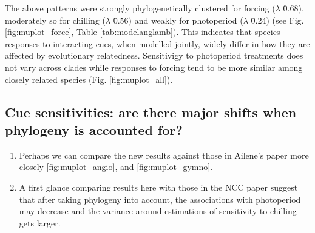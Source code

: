 \documentclass{article}\usepackage[]{graphicx}\usepackage[]{color}
\begin{document}
The above patterns were strongly phylogenetically clustered for forcing ($\lambda$ \= 0.68), moderately so for chilling ($\lambda$ \= 0.56) and weakly for photoperiod ($\lambda$ \= 0.24) (see Fig. \ref{fig:muplot_force}, Table \ref{tab:modelanglamb}). This indicates that species responses to interacting cues, when modelled jointly, widely differ in how they are affected by evolutionary relatedness. Sensitivigy to photoperiod treatments does not vary across clades while responses to forcing tend to be more similar among closely related species (Fig. \ref{fig:muplot_all}).   










\subsection*{Cue sensitivities: are there major shifts when phylogeny is accounted for?}

\begin{enumerate}

\item Perhaps we can compare the new results against those in Ailene's paper more closely \ref{fig:muplot_angio}, and \ref{fig:muplot_gymno}.

\item A first glance comparing results here with those in the NCC paper suggest that after taking phylogeny into account, the associations with photoperiod may decrease and the variance around estimations of sensitivity to chilling gets larger.
\end{enumerate}
\end{document}
